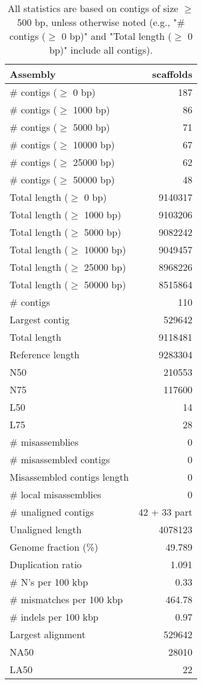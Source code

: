 \documentclass[12pt,a4paper]{article}
\begin{document}
\begin{table}[ht]
\begin{center}
\caption{All statistics are based on contigs of size $\geq$ 500 bp, unless otherwise noted (e.g., "\# contigs ($\geq$ 0 bp)" and "Total length ($\geq$ 0 bp)" include all contigs).}
\begin{tabular}{|l*{1}{|r}|}
\hline
Assembly & scaffolds \\ \hline
\# contigs ($\geq$ 0 bp) & 187 \\ \hline
\# contigs ($\geq$ 1000 bp) & 86 \\ \hline
\# contigs ($\geq$ 5000 bp) & 71 \\ \hline
\# contigs ($\geq$ 10000 bp) & 67 \\ \hline
\# contigs ($\geq$ 25000 bp) & 62 \\ \hline
\# contigs ($\geq$ 50000 bp) & 48 \\ \hline
Total length ($\geq$ 0 bp) & 9140317 \\ \hline
Total length ($\geq$ 1000 bp) & 9103206 \\ \hline
Total length ($\geq$ 5000 bp) & 9082242 \\ \hline
Total length ($\geq$ 10000 bp) & 9049457 \\ \hline
Total length ($\geq$ 25000 bp) & 8968226 \\ \hline
Total length ($\geq$ 50000 bp) & 8515864 \\ \hline
\# contigs & 110 \\ \hline
Largest contig & 529642 \\ \hline
Total length & 9118481 \\ \hline
Reference length & 9283304 \\ \hline
N50 & 210553 \\ \hline
N75 & 117600 \\ \hline
L50 & 14 \\ \hline
L75 & 28 \\ \hline
\# misassemblies & 0 \\ \hline
\# misassembled contigs & 0 \\ \hline
Misassembled contigs length & 0 \\ \hline
\# local misassemblies & 0 \\ \hline
\# unaligned contigs & 42 + 33 part \\ \hline
Unaligned length & 4078123 \\ \hline
Genome fraction (\%) & 49.789 \\ \hline
Duplication ratio & 1.091 \\ \hline
\# N's per 100 kbp & 0.33 \\ \hline
\# mismatches per 100 kbp & 464.78 \\ \hline
\# indels per 100 kbp & 0.97 \\ \hline
Largest alignment & 529642 \\ \hline
NA50 & 28010 \\ \hline
LA50 & 22 \\ \hline
\end{tabular}
\end{center}
\end{table}
\end{document}
